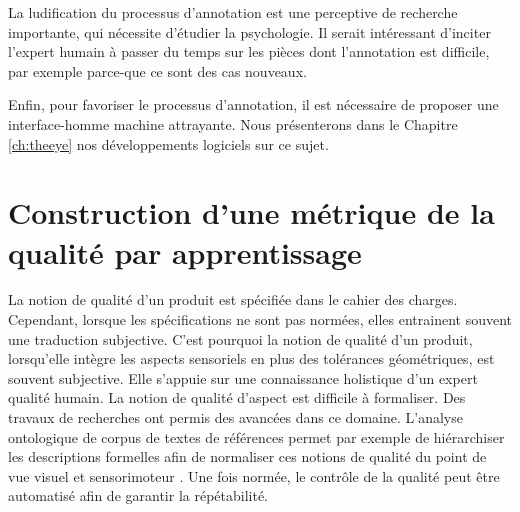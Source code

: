La ludification du processus d'annotation est une perceptive de recherche importante, qui nécessite d'étudier la psychologie.
Il serait intéressant d'inciter l'expert humain à passer du temps sur les pièces dont l'annotation est difficile, par exemple parce-que ce sont des cas nouveaux.

Enfin, pour favoriser le processus d'annotation, il est nécessaire de proposer une interface-homme machine attrayante.
Nous présenterons dans le Chapitre \ref{ch:theeye} nos développements logiciels sur ce sujet.

\bigskip

\bigskip


\newpage
\section{Construction d'une métrique de la qualité par apprentissage} \label{sec:metric_learning}
La notion de qualité d'un produit est spécifiée dans le cahier des charges.
Cependant, lorsque les spécifications ne sont pas normées, elles entrainent souvent une traduction subjective.
C'est pourquoi la notion de qualité d'un produit, lorsqu'elle intègre les aspects sensoriels en plus des tolérances géométriques, est souvent subjective.
Elle s'appuie sur une connaissance holistique d'un expert qualité humain. La notion de qualité d'aspect est difficile à formaliser.
Des travaux de recherches ont permis des avancées dans ce domaine.
L'analyse ontologique de corpus de textes de références permet par exemple de hiérarchiser les descriptions formelles afin de normaliser ces notions de qualité du point de vue visuel \cite{baudet_maitrise_2012} et sensorimoteur \cite{albert_smart_2017}.
Une fois normée, le contrôle de la qualité peut être automatisé \cite{desage_contraintes_2015, pitard_metrologie_2016, lacombe_exploitation_2018a, albert_maitrise_2019} afin de garantir la répétabilité.

